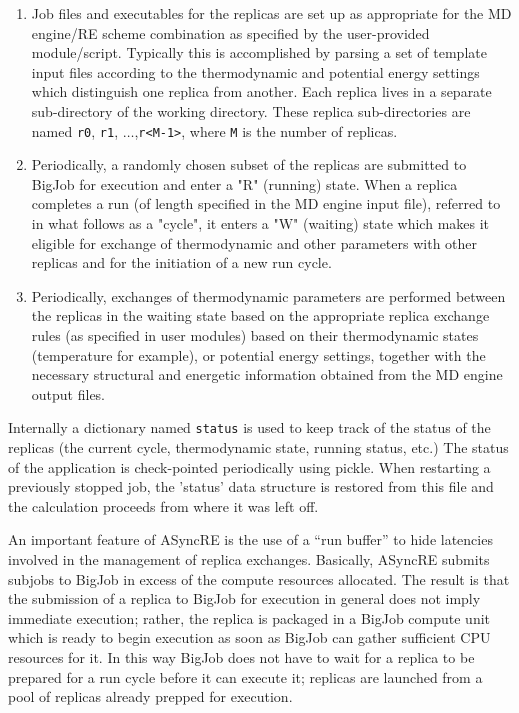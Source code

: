 \documentclass{sig-alternate}
\begin{document}
\begin{enumerate}

\item Job files and executables for the replicas are set up as
  appropriate for the MD engine/RE scheme combination as specified by
  the user-provided module/script. Typically this is accomplished by parsing a
  set of template input files according to the thermodynamic and
  potential energy settings which distinguish one replica from
  another. Each replica lives in a separate sub-directory of the
  working directory. These replica sub-directories are named
  \verb+r0+, {\tt r1}, $\ldots$,\verb+r<M-1>+, where \verb+M+ is the
  number of replicas.

\item Periodically, a randomly chosen subset of the replicas are
  submitted to BigJob for execution and enter a "R" (running)
  state. When a replica completes a run (of length specified in the MD
  engine input file), referred to in what follows as a "cycle", it
  enters a "W" (waiting) state which makes it eligible for exchange of
  thermodynamic and other parameters with other replicas and for the
  initiation of a new run cycle.

\item Periodically, exchanges of thermodynamic parameters are
  performed between the replicas in the waiting state based on the
  appropriate replica exchange rules (as specified in user modules)
  based on their thermodynamic states (temperature for example), or
  potential energy settings, together with the necessary structural
  and energetic information obtained from the MD engine output files.

\end{enumerate}

Internally a dictionary named \verb+status+ is used to keep track of
the status of the replicas (the current cycle, thermodynamic state,
running status, etc.) The status of the application is check-pointed
periodically using pickle. When restarting a previously stopped job,
the 'status' data structure is restored from this file and the
calculation proceeds from where it was left off.

An important feature of ASyncRE is the use of a ``run buffer'' to hide
latencies involved in the management of replica exchanges. Basically,
ASyncRE submits subjobs to BigJob in excess of the compute resources
allocated.  The result is that the submission of a replica
to BigJob for execution in general does not imply immediate execution;
rather, the replica is packaged in a BigJob compute unit which is
ready to begin execution as soon as BigJob can gather sufficient CPU
resources for it. In this way BigJob does not have to wait for a
replica to be prepared for a run cycle before it can execute it;
replicas are launched from a pool of replicas already prepped for
execution.
\end{document}
